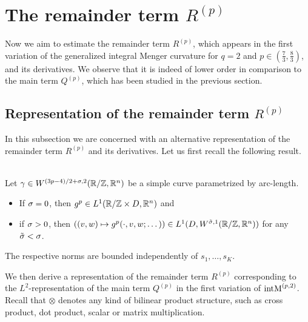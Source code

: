 
\section{The remainder term $R^{(p)}$}
\label{sec:RemainderTermNonCritical}

Now we aim to estimate the remainder term $R^{(p)}$, which appears in the first variation of the generalized integral Menger curvature for $q=2$ and $p\in (\tfrac 73, \tfrac 83)$, and its derivatives. We observe that it is indeed of lower order in comparison to the main term $Q^{(p)}$, which has been studied in the previous section.

\subsection{Representation of the remainder term $R^{(p)}$}

In this subsection we are concerned with an alternative representation of the remainder term $R^{(p)}$ and its derivatives.
Let us first recall the following result.

\begin{lemma}
    \label{lemma:regularityIntegrandRemainder}\ \\
    Let $\g\in W^{(3p-4)/2+\s,2}(\R/\Z,\R^n)$ be a simple curve parametrized by arc-length.
    \begin{itemize}
        \item If $\s=0$, then $\gp\in L^{1}(\R/\Z\times D,\R^{n})$ and
        \item if $\s>0$, then $((v,w) \mapsto \gp(\cdot,v,w;\dots))\in L^{1}(D,\W[\tilde\s,1](\R/\Z, \R^{n}))$ for any $\tilde\s<\s$.
    \end{itemize}
    The respective norms are bounded independently of $s_{1},\dots,s_{K}$.
\end{lemma}

We then derive a representation of the remainder term $R^{(p)}$ corresponding to the $L^2$-re\-pre\-sen\-ta\-tion of the main term $Q^{(p)}$ in the first variation of $\Mpz$. Recall that  $\otimes$ denotes any kind of bilinear product structure, such as cross product, dot product, scalar or matrix multiplication.

